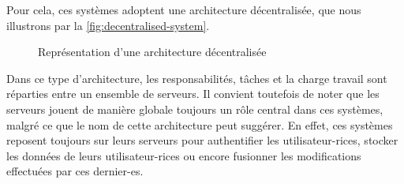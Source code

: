 Pour cela, ces systèmes adoptent une architecture décentralisée, que nous illustrons par la \autoref{fig:decentralised-system}.
\begin{figure}[!ht]
  \centering
  \caption[Caption for decentralised-system]{Représentation d'une architecture décentralisée\footnotemark}
  \label{fig:decentralised-system}
\end{figure}

Dans ce type d'architecture, les responsabilités, tâches et la charge travail sont réparties entre un ensemble de serveurs.
Il convient toutefois de noter que les serveurs jouent de manière globale toujours un rôle central dans ces systèmes, malgré ce que le nom de cette architecture peut suggérer.
En effet, ces systèmes reposent toujours sur leurs serveurs pour authentifier les utilisateur-rices, stocker les données de leurs utilisateur-rices ou encore fusionner les modifications effectuées par ces dernier-es.\\

